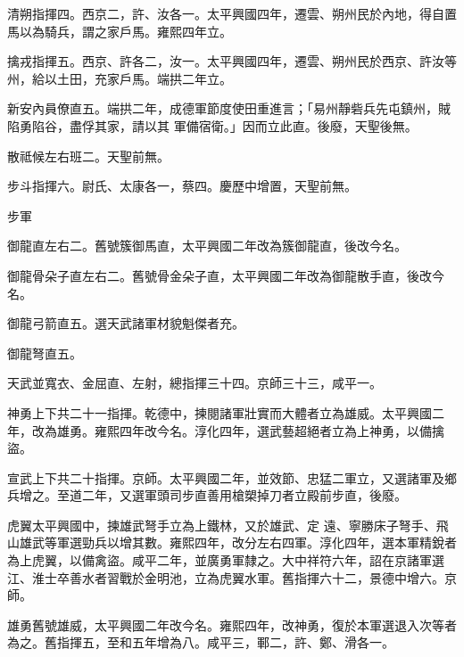 \begin{pinyinscope}
 清朔指揮四。西京二，許、汝各一。太平興國四年，遷雲、朔州民於內地，得自置馬以為騎兵，謂之家戶馬。雍熙四年立。



 擒戎指揮五。西京、許各二，汝一。太平興國四年，遷雲、朔州民於西京、許汝等州，給以土田，充家戶馬。端拱二年立。



 新安內員僚直五。端拱二年，成德軍節度使田重進言；「易州靜砦兵先屯鎮州，賊陷勇陷谷，盡俘其家，請以其
 軍備宿衛。」因而立此直。後廢，天聖後無。



 散祗候左右班二。天聖前無。



 步斗指揮六。尉氏、太康各一，蔡四。慶歷中增置，天聖前無。



 步軍



 御龍直左右二。舊號簇御馬直，太平興國二年改為簇御龍直，後改今名。



 御龍骨朵子直左右二。舊號骨金朵子直，太平興國二年改為御龍散手直，後改今名。



 御龍弓箭直五。選天武諸軍材貌魁傑者充。



 御龍弩直五。



 天武並寬衣、金屈直、左射，總指揮三十四。京師三十三，咸平一。



 神勇上下共二十一指揮。乾德中，揀閱諸軍壯實而大體者立為雄威。太平興國二年，改為雄勇。雍熙四年改今名。淳化四年，選武藝超絕者立為上神勇，以備擒盜。



 宣武上下共二十指揮。京師。太平興國二年，並效節、忠猛二軍立，又選諸軍及鄉兵增之。至道二年，又選軍頭司步直善用槍槊掉刀者立殿前步直，後廢。



 虎翼太平興國中，揀雄武弩手立為上鐵林，又於雄武、定
 遠、寧勝床子弩手、飛山雄武等軍選勁兵以增其數。雍熙四年，改分左右四軍。淳化四年，選本軍精銳者為上虎翼，以備禽盜。咸平二年，並廣勇軍隸之。大中祥符六年，詔在京諸軍選江、淮士卒善水者習戰於金明池，立為虎翼水軍。舊指揮六十二，景德中增六。京師。



 雄勇舊號雄威，太平興國二年改今名。雍熙四年，改神勇，復於本軍選退入次等者為之。舊指揮五，至和五年增為八。咸平三，鄆二，許、鄭、滑各一。




\end{pinyinscope}

